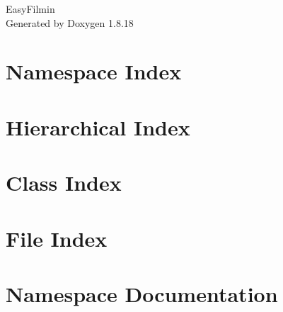 \let\mypdfximage\pdfximage\def\pdfximage{\immediate\mypdfximage}\documentclass[twoside]{book}
\newcommand{\+}{\discretionary{\mbox{\scriptsize$\hookleftarrow$}}{}{}}
\newcommand{\clearemptydoublepage}{%
  \newpage{\pagestyle{empty}\cleardoublepage}%
}
\begin{document}
\hypersetup{pageanchor=false,
             bookmarksnumbered=true,
             pdfencoding=unicode
            }
\begin{titlepage}
\vspace*{7cm}
\begin{center}%
{\Large Easy\+Filmin }\\
\vspace*{1cm}
{\large Generated by Doxygen 1.8.18}\\
\end{center}
\end{titlepage}
\clearemptydoublepage
{}
\tableofcontents
\clearemptydoublepage
{}
\hypersetup{pageanchor=true}

\chapter{Namespace Index}

\chapter{Hierarchical Index}

\chapter{Class Index}

\chapter{File Index}

\chapter{Namespace Documentation}









\end{document}
